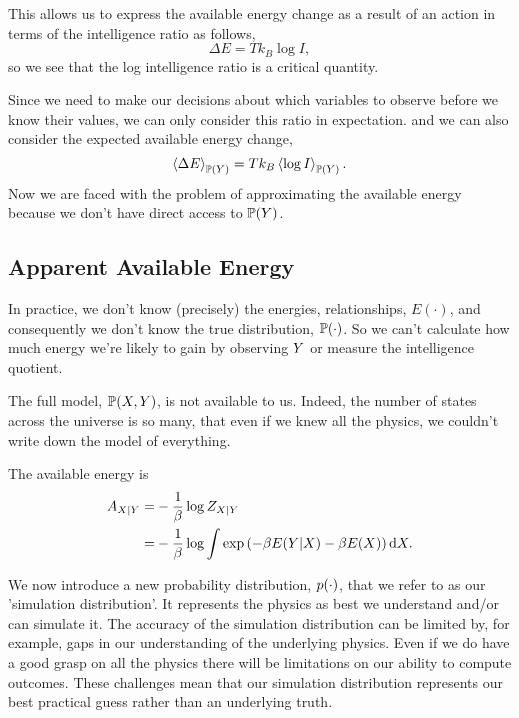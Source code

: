 \documentclass[]{article}
\begin{document}
This allows us to express the available energy change as a result of an action in terms of the intelligence ratio as follows,
\[
\Delta E = T k_B\log I,
\]
so we see that the log intelligence ratio is a critical quantity. 

Since we need to make our decisions about which variables to observe before we know their values, we can only consider this ratio in expectation.
and we can also consider the expected available energy change,
\[
\left\langle \Delta E \right\rangle_{\mathbb{P}(Y)} = T k_B\left\langle \log I \right\rangle_{\mathbb{P}(Y)}.
\]
Now we are faced with the problem of approximating the available energy because we don't have direct access to $\mathbb{P}(Y)$.

\subsection{Apparent Available Energy}

In practice, we don't know (precisely) the energies, relationships,
\(E(\cdot)\), and consequently we don't know the true distribution,
\(\mathbb{P}(\cdot)\). So we can't calculate how much energy we're likely
to gain by observing \(Y\) or measure the intelligence quotient.

The full model, \(\mathbb{P}(X, Y)\), is not
available to us. Indeed, the number of states across the universe is so
many, that even if we knew all the physics, we couldn't write down the
model of everything.

The available energy is 
\begin{align*}
A_{X|Y} = & -\frac{1}{\beta} \log Z_{X|Y} \\
= & -\frac{1}{\beta} \log \int \exp\left(-\beta E(Y|X) -\beta E(X)\right) \text{d}X.
\end{align*}

We now introduce a new probability distribution,  \(p(\cdot)\), that we refer to as our 'simulation distribution'. It represents the physics as best we understand and/or can simulate it. The accuracy of the simulation distribution can be limited by, for example, gaps in our understanding of the underlying physics. Even if we do have a good grasp on all the physics there will be limitations on our ability to compute outcomes. These challenges mean that our simulation distribution represents our best practical guess rather than an underlying truth.
\end{document}
